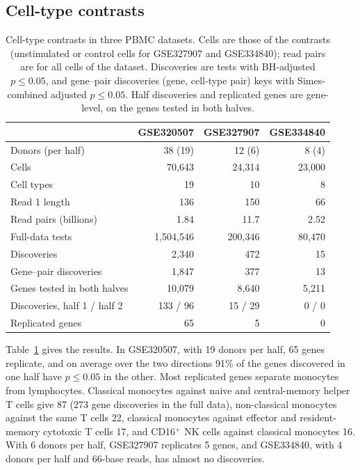 \documentclass[11pt]{article}
\begin{document}
\subsection{Cell-type contrasts}

\begin{table}[ht]
\centering
\small
\begin{tabular}{lrrr}
\toprule
 & GSE320507 & GSE327907 & GSE334840\\
\midrule
Donors (per half) & 38 (19) & 12 (6) & 8 (4)\\
Cells & 70{,}643 & 24{,}314 & 23{,}000\\
Cell types & 19 & 10 & 8\\
Read 1 length & 136 & 150 & 66\\
Read pairs (billions) & 1.84 & 11.7 & 2.52\\
\midrule
Full-data tests & 1{,}504{,}546 & 200{,}346 & 80{,}470\\
Discoveries & 2{,}340 & 472 & 15\\
Gene--pair discoveries & 1{,}847 & 377 & 13\\
\midrule
Genes tested in both halves & 10{,}079 & 8{,}640 & 5{,}211\\
Discoveries, half 1 / half 2 & 133 / 96 & 15 / 29 & 0 / 0\\
Replicated genes & 65 & 5 & 0\\
\bottomrule
\end{tabular}
\caption{Cell-type contrasts in three PBMC datasets. Cells are those of the contrasts (unstimulated or control cells for GSE327907 and GSE334840); read pairs are for all cells of the dataset. Discoveries are tests with BH-adjusted $p\le0.05$, and gene--pair discoveries (gene, cell-type pair) keys with Simes-combined adjusted $p\le0.05$. Half discoveries and replicated genes are gene-level, on the genes tested in both halves.}
\label{tab:pbmc}
\end{table}

Table~\ref{tab:pbmc} gives the results. In GSE320507, with 19 donors per half, 65 genes replicate, and on average over the two directions 91\% of the genes discovered in one half have $p\le0.05$ in the other. Most replicated genes separate monocytes from lymphocytes. Classical monocytes against naive and central-memory helper T cells give 87 (273 gene discoveries in the full data), non-classical monocytes against the same T cells 22, classical monocytes against effector and resident-memory cytotoxic T cells 17, and CD16$^+$ NK cells against classical monocytes 16. With 6 donors per half, GSE327907 replicates 5 genes, and GSE334840, with 4 donors per half and 66-base reads, has almost no discoveries.
\end{document}
